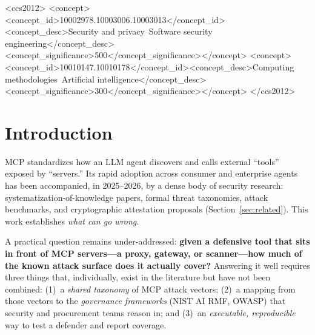 \documentclass[sigconf,review,anonymous]{acmart}
\begin{document}
\begin{CCSXML}
<ccs2012>
<concept><concept_id>10002978.10003006.10003013</concept_id><concept_desc>Security and privacy~Software security engineering</concept_desc><concept_significance>500</concept_significance></concept>
<concept><concept_id>10010147.10010178</concept_id><concept_desc>Computing methodologies~Artificial intelligence</concept_desc><concept_significance>300</concept_significance></concept>
</ccs2012>
\end{CCSXML}


\maketitle

\section{Introduction}
MCP standardizes how an LLM agent discovers and calls external ``tools'' exposed by ``servers.'' Its rapid adoption across consumer and enterprise agents has been accompanied, in 2025--2026, by a dense body of security research: systematization-of-knowledge papers, formal threat taxonomies, attack benchmarks, and cryptographic attestation proposals (Section~\ref{sec:related}). This work establishes \emph{what can go wrong}.

A practical question remains under-addressed: \textbf{given a defensive tool that sits in front of MCP servers---a proxy, gateway, or scanner---how much of the known attack surface does it actually cover?} Answering it well requires three things that, individually, exist in the literature but have not been combined: (1)~a \emph{shared taxonomy} of MCP attack vectors; (2)~a mapping from those vectors to the \emph{governance frameworks} (NIST AI RMF, OWASP) that security and procurement teams reason in; and (3)~an \emph{executable, reproducible} way to test a defender and report coverage.
\end{document}
